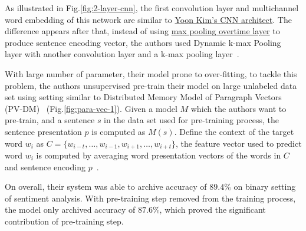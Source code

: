 As illustrated in Fig.\ref{fig:2-layer-cnn}, the first convolution layer and multichannel word embedding of this network are similar to \hyperref[kim-cnn]{Yoon Kim's CNN architect}.
The difference appears after that, instead of using  \hyperref[sec:max-overtime-pooling]{max pooling overtime layer} to produce sentence encoding vector, the authors used Dynamic k-max Pooling~\cite{DCNN} layer with another convolution layer and a k-max pooling layer~\cite{DCNN}.

With large number of parameter, their model prone to over-fitting, to tackle this problem, the authors unsupervised pre-train their model on large unlabeled data set using setting similar to Distributed Memory Model of Paragraph Vectors (PV-DM)~\cite{ParagraphVec} (Fig.\ref{fig:para-vec-1}).
Given a model \(M\) which the authors want to pre-train, and a sentence \(s\) in the data set used for pre-training process, the sentence presentation \(p\) is computed as \(M(s)\).
Define the context of the target word \(w_i\) as \(C = \{w_{i-t},\ldots,w_{i-1}, w_{i+1},\ldots,w_{i+t}\}\), the feature vector used to predict word \(w_i\) is computed by averaging word presentation vectors of the words in \(C\) and sentence encoding \(p\)~\cite{2-layer-cnn}.

On overall, their system was able to archive accuracy of \(89.4\%\) on binary setting of sentiment analysis.
With pre-training step removed from the training process, the model only archived accuracy of \(87.6\%\), which proved the significant contribution of pre-training step.~\cite{2-layer-cnn}
